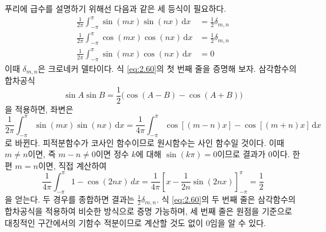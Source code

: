\documentclass[chapter, oneside, b5paper]{oblivoir}
\theoremstyle{plain}
\theoremstyle{definition}
\theoremstyle{remark}
\begin{document}
푸리에 급수를 설명하기 위해선 다음과 같은 세 등식이 필요하다.
\begin{equation}
\begin{split}
     \frac{1}{2\pi}\int_{-\pi}^{\pi} \sin{(mx)}\sin{(nx)} \,\mathrm{d}x &= \frac{1}{2}\delta_{m,n} \\
     \frac{1}{2\pi}\int_{-\pi}^{\pi} \cos{(mx)}\cos{(nx)} \,\mathrm{d}x &= \frac{1}{2}\delta_{m,n} \\
     \frac{1}{2\pi}\int_{-\pi}^{\pi} \sin{(mx)}\cos{(nx)} \,\mathrm{d}x &= 0  
\end{split} 
\label{eq:2.60}
\end{equation}
이때 $\delta_{m,n}$은 크로네커 델타이다. 식 \ref{eq:2.60}의 첫 번째 줄을 증명해 보자. 삼각함수의 합차공식
\begin{equation}
    \sin A \sin B = \frac{1}{2}\big(\cos(A-B) - \cos(A+B)\big) \label{eq:2.61}
\end{equation}
을 적용하면, 좌변은
\begin{equation}
    \frac{1}{2\pi} \int_{-\pi}^{\pi} \sin{(mx)}\sin{(nx)} \,\mathrm{d}x = \frac{1}{4\pi} \int_{-\pi}^{\pi}\cos{[(m-n)x]}-\cos{[(m+n)x]} \,\mathrm{d}x
    \label{eq:2.62}
\end{equation}
로 바뀐다. 피적분함수가 코사인 함수이므로 원시함수는 사인 함수일 것이다. 이때 $m \neq n$이면, 즉 $m-n \neq 0$이면 정수 $k$에 대해 $\sin(k\pi) = 0$이므로 결과가 0이다. 한편 $m=n$이면, 직접 계산하여
\begin{equation}
   \frac{1}{4\pi}\int_{-\pi}^{\pi}1-\cos{(2nx)} \,dx = \frac{1}{4\pi}\left[x-\frac{1}{2n}\sin{(2nx)}\right]_{-\pi}^{\pi} = \frac{1}{2} \label{eq:2.63}
\end{equation}
 을 얻는다. 두 경우를 종합하면 결과는 $\frac{1}{2}\delta_{m,n}$. 식 \ref{eq:2.60}의 두 번째 줄은 삼각함수의 합차공식을 적용하여 비슷한 방식으로 증명 가능하며, 세 번째 줄은 원점을 기준으로 대칭적인 구간에서의 기함수 적분이므로 계산할 것도 없이 0임을 알 수 있다.
\end{document}
